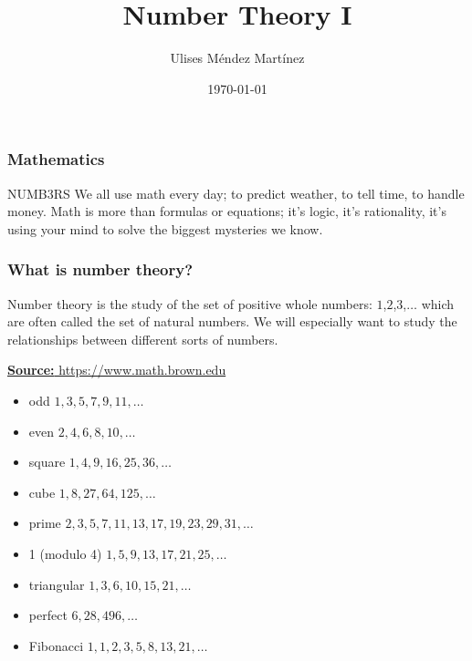 \documentclass{beamer}
\title[Number Theory I]{Number Theory I} %
\author{Ulises M\'endez Mart\'{i}nez} %
\institute[UTM] %
{
Algorist Weekly Talks \\ %
\medskip
\textit{ulisesmdzmtz@gmail.com} %
}
\date{\today} %
\begin{document}
\begin{frame}
\titlepage %
\end{frame}


\begin{frame}
\frametitle{Mathematics}
\begin{block}{NUMB3RS}
We all use math every day; to predict weather, to tell time, to handle money.
Math is more than formulas or equations; it's logic, it's rationality,
it's using your mind to solve the biggest mysteries we know.
\end{block}
\end{frame}

\begin{frame}[fragile]
\frametitle{What is number theory?}
Number theory is the study of the set of positive whole numbers: $1$,$2$,$ 3$,$ \dots $ which are often called the set of natural numbers. We will especially want to study the relationships between different sorts of numbers. 
\begin{block} { \href{https://www.math.brown.edu/~jhs/}{\textbf{Source:} https://www.math.brown.edu}} 
\begin{itemize}
\item odd $1, 3, 5, 7, 9, 11, \dots$
\item even $ 2, 4, 6, 8, 10, \dots$
\item square $ 1, 4, 9, 16, 25, 36, \dots$
\item cube $ 1, 8, 27, 64, 125, \dots$
\item prime $ 2, 3, 5, 7, 11, 13, 17, 19, 23, 29, 31, \dots$
\item 1 (modulo 4) $ 1, 5, 9, 13, 17, 21, 25, \dots$
\item triangular $ 1, 3, 6, 10, 15, 21, \dots$
\item perfect $ 6, 28, 496, \dots$
\item Fibonacci $ 1, 1, 2, 3, 5, 8, 13, 21, \dots$
\end{itemize}
\end{block}
\end{frame}
\end{document}
